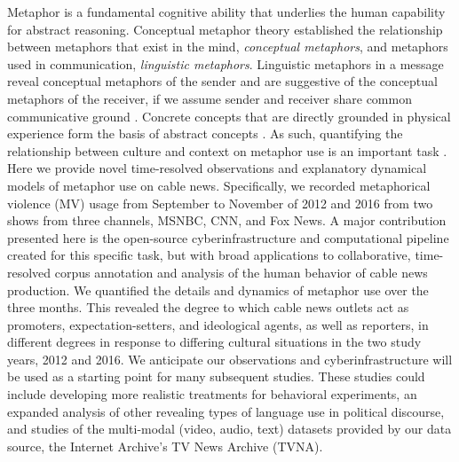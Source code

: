 Metaphor is a fundamental cognitive ability that underlies the human capability 
for abstract reasoning. 
Conceptual metaphor theory established the relationship
between metaphors that exist in the mind, \emph{conceptual metaphors}, and 
metaphors used in communication, \emph{linguistic metaphors}. Linguistic metaphors
in a message reveal conceptual metaphors of the sender and
are suggestive of the conceptual metaphors of the receiver, if we assume
sender and receiver share common communicative ground \cite{Clark1996}.
Concrete concepts that are directly grounded in physical experience 
form the basis of abstract concepts \cite{Lakoff1980}. As such, quantifying 
the relationship between culture and context
on metaphor use is an important task \cite{Kovecses2010}.
Here we provide novel time-resolved observations and explanatory
dynamical models of metaphor use on cable news. 
Specifically, 
we recorded metaphorical violence (MV) usage from September to November
of 2012 and 2016 from two shows from three channels, 
MSNBC, CNN, and Fox News. A major contribution presented here is the open-source 
cyberinfrastructure and computational pipeline created for this specific task, 
but with broad applications
to collaborative, time-resolved corpus annotation and analysis of the
human behavior of cable news production. We quantified the details and dynamics of metaphor
use over the three months. This revealed the
degree to which cable news outlets act as promoters, expectation-setters, and
ideological agents, as well as reporters, in different degrees in response to
differing cultural situations in the two study years, 2012 and 2016. 
We anticipate our observations and cyberinfrastructure will be used
as a starting point for many subsequent studies. These studies could include 
developing more realistic
treatments for behavioral experiments, an expanded analysis of 
other revealing types of language use in 
political discourse, and studies of 
the multi-modal (video, audio, text) datasets provided by our 
data source, the Internet Archive's TV News Archive (TVNA).


